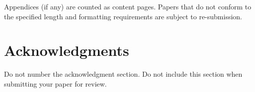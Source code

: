 \documentclass[11pt,letterpaper]{article}
\begin{document}
Appendices (if any) are counted as content pages. Papers that do not conform to the specified length and
formatting requirements are subject to re-submission.


\section*{Acknowledgments}

Do not number the acknowledgment section. Do not include this section when submitting your paper for review.


\end{document}
